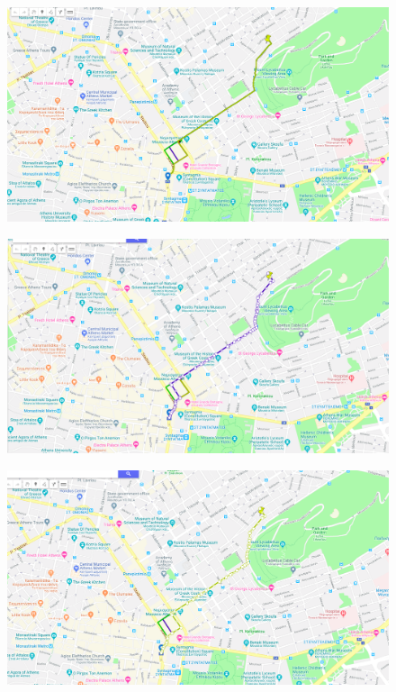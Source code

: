 \documentclass[a4paper,oneside, 11pt]{article}
\begin{document}
\begin{figure}[H]
\includegraphics[width=\textwidth]{alt1.png}
\end{figure}

\begin{figure}[H]
\includegraphics[width=\textwidth]{alt2.png}
\end{figure}


\begin{figure}[H]
\includegraphics[width=\textwidth]{alt3.png}
\end{figure}
\end{document}
